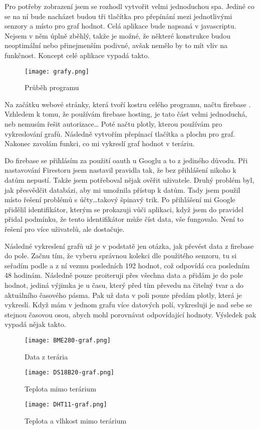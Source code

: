 Pro potřeby zobrazení jsem se rozhodl vytvořit velmi jednoduchou \gls{spa}. Jediné co se na ní bude nacházet budou tři 
tlačítka pro přepínání mezi jednotlivými senzory a místo pro graf hodnot. Celá aplikace bude napsaná v javascriptu. 
Nejsem v něm úplně zběhlý, takže je možné, že některé konstrukce budou neoptimální nebo přinejmenším podivné, avšak 
nemělo by to mít vliv na funkčnost. Koncept celé aplikace vypadá takto.

\begin{figure}[H]
  \centering
  \texttt{[image: grafy.png]}
  \caption{Průběh programu}
\end{figure}

Na začátku webové stránky, která tvoří kostru celého programu, načtu \gls{firebase} . 
Vzhledem k tomu, že používám \gls{firebase} hosting, je tato část velmi jednoduchá, neb nemusím řešit autorizace\ldots 
Poté načtu  \gls{plotly}, kterou používám pro vykreslování grafů. Následně vytvořím 
přepínací tlačítka a plochu pro graf. Nakonec zavolám funkci, co mi vykreslí graf hodnot v teráriu.

Do \gls{firebase} se přihlásím za použití \gls{oauth} u Googlu a to z jediného důvodu. Při nastavování Firestoru jsem 
nastavil pravidla tak, že bez přihlášení nikoho k datům nepustí. Takže jsem potřeboval nějak ověřit uživatele. Druhý 
problém byl, jak přesvědčit databázi, aby mi umožnila přístup k datům. Tady jsem použil místo řešení problémů 
s účty\ldots takový špinavý trik. Po přihlášení mi Google přidělil identifikátor, kterým se prokazuji vůči aplikaci, 
když jsem do pravidel přidal podmínku, že tento identifikátor může číst data, vše fungovalo. Není to řešení pro více 
uživatelů, ale dostačuje.

Následné vykreslení grafů už je v podstatě jen otázka, jak převést data z \gls{firebase} do pole. Začnu tím, že vyberu 
správnou kolekci dle použitého senzoru, tu si seřadím podle  a z ní vezmu posledních 192 
hodnot, což odpovídá cca posledním 48 hodinám. Následně pouze proiteruji přes všechna data a přidám je do pole hodnot, 
jediná výjimka je u času, který před tím převedu na čitelný tvar a do aktuálního časového pásma. Pak už data v poli 
pouze předám  \gls{plotly}, která je vykreslí. Když mám v jednom grafu více datových polí, 
vykresluji je nad sebe se stejnou časovou osou, abych mohl porovnávat odpovídající hodnoty. Výsledek pak vypadá nějak 
takto.

\begin{figure}[H]
    \centering
    \texttt{[image: BME280-graf.png]}
    \caption{Data z terária}
\end{figure}
\begin{figure}[H]
    \centering
    \texttt{[image: DS18B20-graf.png]}
    \caption{Teplota mimo terárium}
\end{figure}
\begin{figure}[H]
    \centering
    \texttt{[image: DHT11-graf.png]}
    \caption{Teplota a vlhkost mimo terárium}
\end{figure}

